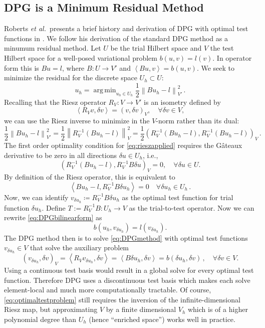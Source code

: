 \documentclass[letterpaper]{article}
\DeclareMathOperator*{\argmin}{\arg\,\min}
\newcommand{\eqnref}[1]{\eqref{eq:#1}}
\newcommand{\norm}[1]{\left\| #1 \right\|}
\newcommand{\LRp}[1]{\left( #1 \right)}
\newcommand{\LRa}[1]{\left\langle #1 \right\rangle}
\def\etal{{\it et al.~}}
\begin{document}
\subsection{DPG is a Minimum Residual Method}
Roberts \etal presents a brief history and derivation of DPG with optimal test functions in
\cite{DPGStokes}. We follow his derivation of the standard DPG method as a
minumum residual method. Let $U$ be the trial Hilbert space and $V$ the test
Hilbert space for a well-posed variational problem $b(u,v)=l(v)$. In operator
form this is $Bu=l$, where $B:U\rightarrow V'$ and $\LRa{Bu,v}=b(u,v)$. We seek to minimize the
residual for the discrete space $U_h\subset U$:
\begin{equation}
u_h=\argmin_{u_h\in U_h}\frac{1}{2}\norm{Bu_h-l}^2_{V'}\,.
\label{minresidual}
\end{equation}
Recalling that the Riesz operator $R_V:V\rightarrow V'$ is an isometry defined
by
\[
\LRa{R_Vv,\delta v}=\LRp{v,\delta v}_V,\quad\forall\delta v\in V,
\]
we can use the Riesz inverse to minimize in the $V$-norm rather than its dual:
\begin{equation}
\frac{1}{2}\norm{Bu_h-l}^2_{V'}=\frac{1}{2}\norm{R_V^{-1}(Bu_h-l)}^2_V
=\frac{1}{2}\LRp{R_V^{-1}(Bu_h-l),R_V^{-1}(Bu_h-l)}_V\,.
\label{eq:rieszapplied}
\end{equation}
The first order optimality condition for \eqnref{rieszapplied} requires
the G\^ateaux derivative to be zero in all directions $\delta u \in
U_h$, i.e.,
\[
\left(R_V^{-1}(Bu_h-l),R_V^{-1}B\delta u\right)_V = 0, \quad \forall \delta u \in U.
\]
By definition of the Riesz operator, this is equivalent to
\begin{equation}
\LRa{Bu_h-l,R_V^{-1}B\delta u_h}=0\quad\forall\delta u_h\in U_h\,.
\label{eq:DPGbilinearform}
\end{equation}
Now, we can identify $v_{\delta u_h}\coloneqq R_V^{-1}B\delta u_h$ as the
optimal test function for trial function $\delta u_h$. Define $T:=R_V^{-1}B:U_h\rightarrow V$ as the trial-to-test operator. Now we can rewrite
\eqnref{DPGbilinearform} as
\begin{equation}
b(u_h,v_{\delta u_h})=l(v_{\delta u_h}).
\label{eq:DPGmethod}
\end{equation}
The DPG method then is to solve \eqnref{DPGmethod} with optimal test functions
$v_{\delta u_h}\in V$ that solve the auxiliary problem
\begin{equation}
\LRp{v_{\delta u_h},\delta v}_V=\LRa{R_Vv_{\delta u_h},\delta v}
=\LRa{B\delta u_h,\delta v}=b(\delta u_h,\delta v)\,,\quad\forall\delta v\in V.
\label{eq:optimaltestproblem}
\end{equation}
Using a continuous test basis would result in a global solve for every optimal
test function. Therefore DPG uses a discontinuous test basis which makes each
solve element-local and much more computationally tractable. Of course,
\eqnref{optimaltestproblem} still requires the inversion of the
infinite-dimensional Riesz map, but approximating $V$ by a finite
dimensional $V_h$ which is of a higher polynomial degree than $U_h$ (hence
``enriched space'') works well in practice.
\end{document}
